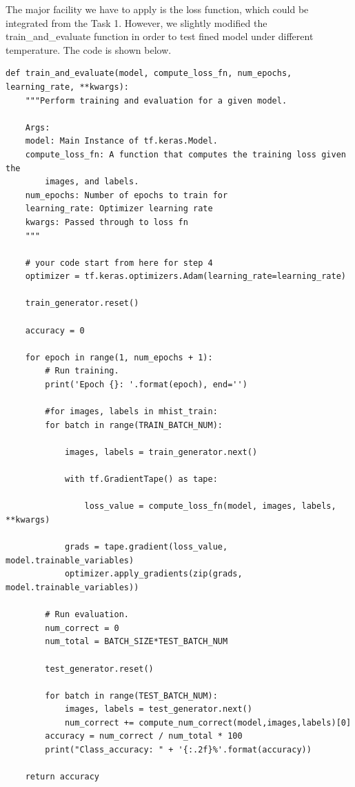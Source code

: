 \documentclass[conference]{IEEEtran}
\begin{document}
The major facility we have to apply is the loss function, which could be integrated from the Task 1. However, we slightly modified the train\_and\_evaluate function in order to test fined model under different temperature. The code is shown below.

\begin{lstlisting}
def train_and_evaluate(model, compute_loss_fn, num_epochs, learning_rate, **kwargs):
    """Perform training and evaluation for a given model.

    Args:
    model: Main Instance of tf.keras.Model.
    compute_loss_fn: A function that computes the training loss given the
        images, and labels.
    num_epochs: Number of epochs to train for
    learning_rate: Optimizer learning rate
    kwargs: Passed through to loss fn
    """

    # your code start from here for step 4
    optimizer = tf.keras.optimizers.Adam(learning_rate=learning_rate)

    train_generator.reset()
    
    accuracy = 0
    
    for epoch in range(1, num_epochs + 1):
        # Run training.
        print('Epoch {}: '.format(epoch), end='')

        #for images, labels in mhist_train:
        for batch in range(TRAIN_BATCH_NUM):
            
            images, labels = train_generator.next()

            with tf.GradientTape() as tape:

                loss_value = compute_loss_fn(model, images, labels, **kwargs)

            grads = tape.gradient(loss_value, model.trainable_variables)
            optimizer.apply_gradients(zip(grads, model.trainable_variables))

        # Run evaluation.
        num_correct = 0
        num_total = BATCH_SIZE*TEST_BATCH_NUM
        
        test_generator.reset()
        
        for batch in range(TEST_BATCH_NUM):
            images, labels = test_generator.next()
            num_correct += compute_num_correct(model,images,labels)[0]
        accuracy = num_correct / num_total * 100
        print("Class_accuracy: " + '{:.2f}%'.format(accuracy))
    
    return accuracy
\end{lstlisting}
\end{document}
